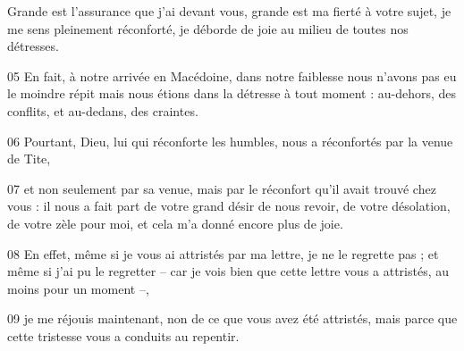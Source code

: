 Grande est l’assurance que j’ai devant vous, grande est ma fierté à votre sujet, je me sens pleinement réconforté, je déborde de joie au milieu de toutes nos détresses.

05 En fait, à notre arrivée en Macédoine, dans notre faiblesse nous n’avons pas eu le moindre répit mais nous étions dans la détresse à tout moment : au-dehors, des conflits, et au-dedans, des craintes.

06 Pourtant, Dieu, lui qui réconforte les humbles, nous a réconfortés par la venue de Tite,

07 et non seulement par sa venue, mais par le réconfort qu’il avait trouvé chez vous : il nous a fait part de votre grand désir de nous revoir, de votre désolation, de votre zèle pour moi, et cela m’a donné encore plus de joie.

08 En effet, même si je vous ai attristés par ma lettre, je ne le regrette pas ; et même si j’ai pu le regretter – car je vois bien que cette lettre vous a attristés, au moins pour un moment –,

09 je me réjouis maintenant, non de ce que vous avez été attristés, mais parce que cette tristesse vous a conduits au repentir.
